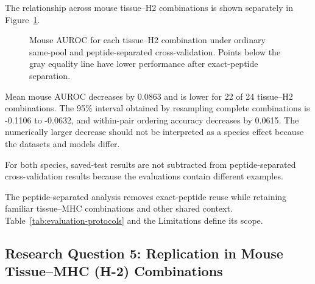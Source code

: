 The relationship across mouse tissue--H2 combinations is shown separately in Figure~\ref{fig:mouse-standard-strict-scatter}.
\begin{figure}[!t]
\centering
{}
\caption{Mouse AUROC for each tissue--H2 combination under ordinary same-pool and peptide-separated cross-validation. Points below the gray equality line have lower performance after exact-peptide separation.}
\label{fig:mouse-standard-strict-scatter}
\end{figure}

Mean mouse AUROC decreases by 0.0863 and is lower for 22 of 24 tissue--H2 combinations. The 95\% interval obtained by resampling complete combinations is -0.1106 to -0.0632, and within-pair ordering accuracy decreases by 0.0615. The numerically larger decrease should not be interpreted as a species effect because the datasets and models differ.

For both species, saved-test results are not subtracted from peptide-separated cross-validation results because the evaluations contain different examples.

The peptide-separated analysis removes exact-peptide reuse while retaining familiar tissue--MHC combinations and other shared context. Table~\ref{tab:evaluation-protocols} and the Limitations define its scope.

\subsection{Research Question 5: Replication in Mouse Tissue--MHC (H-2) Combinations}

